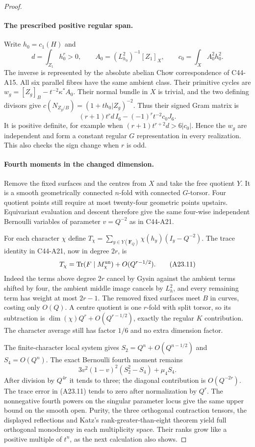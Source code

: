 \documentclass[11pt]{article}
\theoremstyle{remark}\newtheorem{remark}[theorem]{Remark}
\begin{document}
\begin{proof}
\paragraph{The prescribed positive regular span.}
Write $h_0=c_1(H)$ and
\[
 d=\int_{Z_1}h_0^r>0,\qquad
 A_0=(L_{h_0}^2)^{-1}[Z_1]_X,\qquad
 c_0=\int_XA_0^2h_0^2.
 \tag{A23.9}
\]
The inverse is represented by the absolute abelian Chow correspondence
of C44-A15.  All six parallel fibres have the same ambient class.
Their primitive cycles are
$w_g=[Z_g]_B-t^{-2}\kappa^*A_0$.
Their normal bundle in $X$ is trivial, and the two defining divisors
give
$c(N_{Z_g/B})=(1+th_0|Z_g)^{-2}$.
Thus their signed Gram matrix is
\[
        (r+1)t^r d\,I_6-(-1)^r t^{-2}c_0J_6.
 \tag{A23.10}
\]
It is positive definite, for example when
$(r+1)t^{r+2}d>6|c_0|$.  Hence the $w_g$ are independent and form a
constant regular $G$ representation in every realization.  This also
checks the sign change when $r$ is odd.

\paragraph{Fourth moments in the changed dimension.}
Remove the fixed surfaces and the centres from $X$ and take the free
quotient $Y$.  It is a smooth geometrically connected $n$-fold with
connected $G$-torsor.  Four quotient points still require at most
twenty-four geometric points upstairs.  Equivariant evaluation and
descent therefore give the same four-wise independent Bernoulli
variables of parameter $v=Q^{-2}$ as in C44-A21.

For each character $\chi$ define
$T_\chi=\sum_{y\in Y(\mathbf F_Q)}\chi(h_y)(I_y-Q^{-2})$.
The trace identity in C44-A21, now in degree $2r$, is
\[
 T_\chi=\operatorname{Tr}(F\mid M_\chi^{\rm un})
                                  +O(Q^{r-1/2}).
 \tag{A23.11}
\]
Indeed the terms above degree $2r$ cancel by Gysin against the ambient
terms shifted by four, the ambient middle image cancels by $L_h^2$,
and every remaining term has weight at most $2r-1$.  The removed fixed
surfaces meet $B$ in curves, costing only $O(Q)$.  A centre quotient is
one $r$-fold with split torsor, so its subtraction is
$\dim(\chi)Q^r+O(Q^{r-1/2})$, exactly the regular $K$ contribution.
The character average still has factor $1/6$ and no extra dimension
factor.

The finite-character local system gives
$S_2=Q^n+O(Q^{n-1/2})$ and $S_4=O(Q^n)$.
The exact Bernoulli fourth moment remains
\[
                 3v^2(1-v)^2(S_2^2-S_4)+\mu_4S_4.
 \tag{A23.12}
\]
After division by $Q^{4r}$ it tends to three; the diagonal contribution
is $O(Q^{-2r})$.  The trace error in (A23.11) tends to zero after
normalization by $Q^r$.  The nonnegative fourth powers on the singular
parameter locus give the same upper bound on the smooth open.  Purity,
the three orthogonal contraction tensors, the displayed reflections
and Katz's rank-greater-than-eight theorem yield full orthogonal
monodromy in each multiplicity space.  Their ranks grow like a positive
multiple of $t^n$, as the next calculation also shows.


\end{proof}
\end{document}
